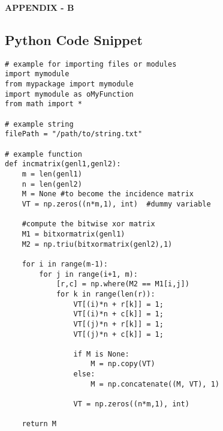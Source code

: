 \newpage
\thispagestyle{empty}
\begin{center}
    {\bfseries \hypertarget{appendixb}{APPENDIX - B} }
    \vspace{1\baselineskip}
\end{center}

\subsection*{Python Code Snippet} 


\begin{lstlisting}
# example for importing files or modules
import mymodule
from mypackage import mymodule
import mymodule as oMyFunction
from math import *

# example string
filePath = "/path/to/string.txt"

# example function
def incmatrix(genl1,genl2):
    m = len(genl1)
    n = len(genl2)
    M = None #to become the incidence matrix
    VT = np.zeros((n*m,1), int)  #dummy variable
    
    #compute the bitwise xor matrix
    M1 = bitxormatrix(genl1)
    M2 = np.triu(bitxormatrix(genl2),1) 

    for i in range(m-1):
        for j in range(i+1, m):
            [r,c] = np.where(M2 == M1[i,j])
            for k in range(len(r)):
                VT[(i)*n + r[k]] = 1;
                VT[(i)*n + c[k]] = 1;
                VT[(j)*n + r[k]] = 1;
                VT[(j)*n + c[k]] = 1;
                
                if M is None:
                    M = np.copy(VT)
                else:
                    M = np.concatenate((M, VT), 1)
                
                VT = np.zeros((n*m,1), int)
    
    return M
\end{lstlisting}


\clearpage{}
